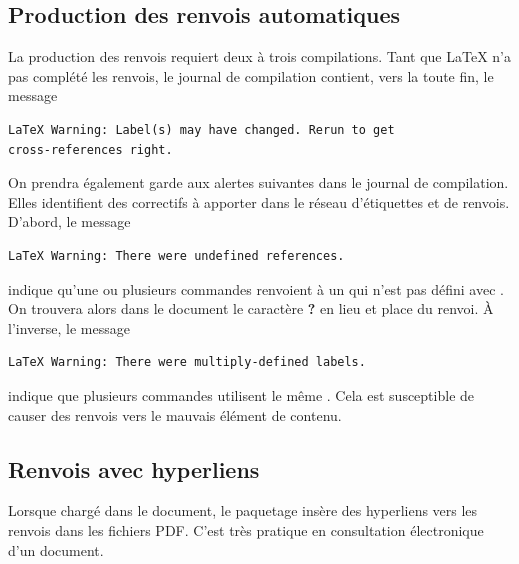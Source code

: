 \subsection{Production des renvois automatiques}
\label{sec:organisation:renvois:production}

La production des renvois requiert deux à trois compilations.
Tant que {\LaTeX} n'a pas complété les renvois, le journal de
compilation contient, vers la toute fin, le message
\begin{verbatim}
LaTeX Warning: Label(s) may have changed. Rerun to get
cross-references right.
\end{verbatim}

On prendra également garde aux alertes suivantes dans le journal de
compilation. Elles identifient des correctifs à apporter dans le
réseau d'étiquettes et de renvois. D'abord, le message
\begin{verbatim}
LaTeX Warning: There were undefined references.
\end{verbatim}
indique qu'une ou plusieurs commandes \cmd{\ref} renvoient à un
 qui n'est pas défini avec \cmd{\label}. On trouvera alors
dans le document le caractère \textbf{?} en lieu et place du renvoi. À
l'inverse, le message
\begin{verbatim}
LaTeX Warning: There were multiply-defined labels.
\end{verbatim}
indique que plusieurs commandes \cmdprint{\label} utilisent le même
. Cela est susceptible de causer des renvois vers le mauvais
élément de contenu.

\subsection{Renvois avec hyperliens}
\label{sec:organisation:renvois:hyperliens}

Lorsque chargé dans le document, le paquetage  insère
des hyperliens vers les renvois dans les fichiers PDF. C'est très
pratique en consultation électronique d'un document.


